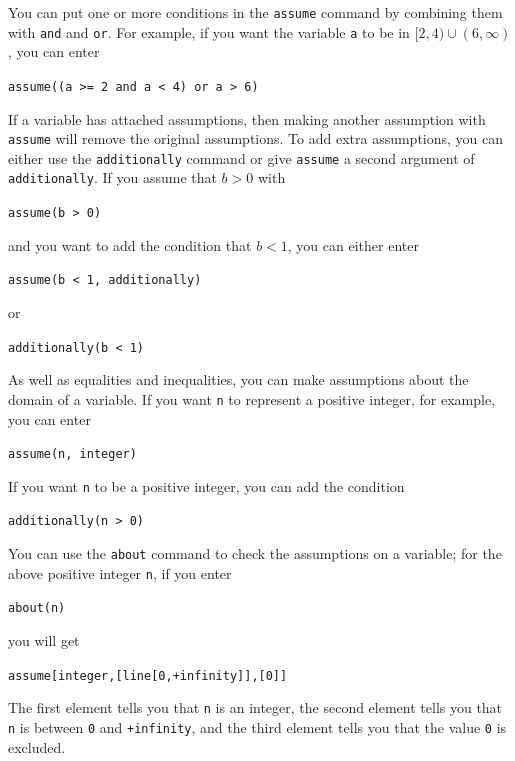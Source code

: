 \documentclass[a4paper,11pt]{book}
\begin{document}
You can put one or more conditions in the \texttt{assume} command by
combining them with \texttt{and} and \texttt{or}.
For example, if you want the variable \texttt{a} to be in $[2,4) \cup
(6,\infty)$, you can enter
\begin{center}
  {\tt assume((a >= 2 and a < 4) or a > 6)}
\end{center}

If a variable has attached assumptions, then making another assumption
with \texttt{assume} will remove the original assumptions.  To add
extra assumptions, you can either use the
\texttt{additionally} command or give
\texttt{assume} a second argument of
\texttt{additionally}.  If
you assume that $b > 0$ with
\begin{center}
  {\tt assume(b > 0)}
\end{center}
and you want to add the condition that $b < 1$, you can either enter
\begin{center}
  {\tt assume(b < 1, additionally)}
\end{center}
or
\begin{center}
  {\tt additionally(b < 1)}
\end{center}

As well as equalities and inequalities, you can make assumptions about
the domain of a variable.  If you want \texttt{n} to represent a
positive integer, for example, you can enter
\begin{center}
  {\tt assume(n, integer)}
\end{center}
If you want \texttt{n} to be a positive integer, you can add the
condition
\begin{center}
  {\tt additionally(n > 0)}
\end{center}

You can use the \texttt{about} command to check the assumptions on a
variable; for the above positive integer \texttt{n}, if you enter
\begin{center}
  {\tt about(n)}
\end{center}
you will get
\begin{center}
  {\tt assume[integer,[line[0,+infinity]],[0]]}
\end{center}
The first element tells you that \texttt{n} is an integer, the second
element tells you that \texttt{n} is between \texttt{0} and
\texttt{+infinity}, and the third element tells you that the value
\texttt{0} is excluded.
\end{document}
